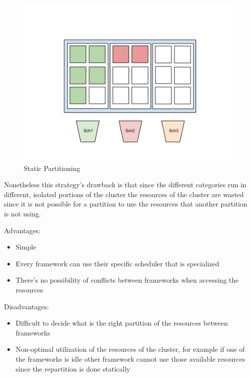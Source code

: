 \documentclass{svjour3}                     %
\begin{document}
\begin{figure}[!ht]
  \centering
  \includegraphics[scale=0.25,natwidth=960,natheight=720]{StaticPartitioning.png}
  \caption{Static Partitioning}
  \label{fig:static_partitioning}
\end{figure}

Nonetheless this strategy's drawback is that since the different 
categories run in different, isolated portions of the cluster the
resources of the cluster are wasted since it is not possible for
a partition to use the resources that another partition is not using.

Advantages:

\begin{itemize}
    \item Simple
    \item Every framework can use their specific scheduler that is specialized
    \item There's no possibility of conflicts between frameworks when
      accessing the resources
\end{itemize}

Disadvantages:

\begin{itemize}
  \item Difficult to decide what is the right partition of the resources
between frameworks
  \item Non-optimal utilization of the resources of the cluster, for example
if one of the frameworks is idle other framework cannot use those
available resources since the repartition is done statically
\end{itemize}
\end{document}
